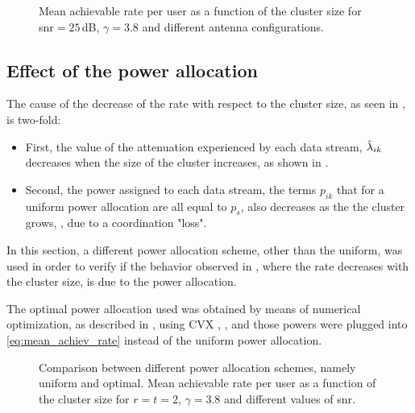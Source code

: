 \begin{figure}[t]
\begin{center}
    \dummybox
\end{center}
\caption{Mean achievable rate per user as a function of the cluster size for
\gls{snr}$=25\,$dB, $\gamma=3.8$ and different antenna configurations.}
\label{fig:rate_vs_size_antenna}
\end{figure}

\subsection{Effect of the power allocation}\label{ssec:achiev_power_allocation}

The cause of the decrease of the rate with respect to the cluster size, as seen
in , is two-fold:

\begin{itemize}
    \item First, the value of the attenuation experienced by each data stream,
        $\hat{\lambda}_{ik}$ decreases when the size of the cluster increases, as
        shown in .
    \item Second, the power assigned to each data stream, the terms $p_{ik}$
        that for a uniform power allocation are all equal to $p_s$, also
        decreases as the the cluster grows, , due to a
        coordination "loss".
\end{itemize}

In this section, a different power allocation scheme, other than the uniform,
was used in order to verify if the behavior observed in
, where the rate decreases with the cluster size,
is due to the power allocation.

The optimal power allocation used was obtained by means of numerical
optimization, as described in \cite{armada11b}, using CVX \cite{cvx},
\cite{gb08}, and those powers were plugged into \eqref{eq:mean_achiev_rate}
instead of the uniform power allocation.

\begin{figure}[t]
\begin{center}
    \dummybox
\end{center}
\caption{Comparison between different power allocation schemes, namely uniform
and optimal. Mean achievable rate per user as a function of the cluster size for
$r=t=2$, $\gamma=3.8$ and different values of \gls{snr}.}
\label{fig:rate_vs_size_power}
\end{figure}

